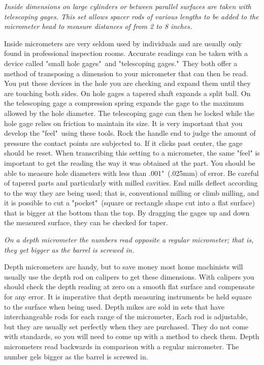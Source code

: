 \bigskip
\textit{Inside dimensions on large cylinders or between parallel surfaces are
taken with telescoping gages. This set allows spacer rods of various lengths to
be added to the micrometer head to measure distances of from 2 to 8 inches.}
\bigskip


Inside micrometers are very seldom used by individuals and are usually only
found in professional inspection rooms. Accurate readings can be taken with a
device called "small hole gages"\ and "telescoping gages."\ They both offer a
method of transposing a dimension to your micrometer that can then be read. You
put these devices in the hole you are checking and expand them until they are
touching both sides. On hole gages a tapered shaft expands a split ball. On the
telescoping gage a compression spring expands the gage to the maximum allowed by
the hole diameter. The telescoping gage can then be locked while the hole gage
relies on friction to maintain its size. It is very important that you develop
the "feel"\ using these tools. Rock the handle end to judge the amount of
pressure the contact points are subjected to. If it clicks past center, the gage
should be reset. When transcribing this setting to a micrometer, the same "feel"
is important to get the reading the way it was obtained at the part. You should
be able to measure hole diameters with less than .001"\ (.025mm) of error. Be
careful of tapered parts and particularly with milled cavities. End mills
deflect according to the way they are being used; that is, conventional milling
or climb milling, and it is possible to cut a "pocket"\ (square or rectangle
shape cut into a flat surface) that is bigger at the bottom than the top. By
dragging the gages up and down the measured surface, they can be checked for
taper.

\bigskip
\textit{On a depth micrometer the numbers read opposite a regular micrometer;
that is, they get bigger as the barrel is screwed in.}
\bigskip


Depth micrometers are handy, but to save money most home machinists will usually
use the depth rod on calipers to get these dimensions. With calipers you should
check the depth reading at zero on a smooth flat surface and compensate for any
error. It is imperative that depth measuring instruments be held square to the
surface when being used. Depth mikes are sold in sets that have interchangeable
rods for each range of the micrometer, Each rod is adjustable, but they are
usually set perfectly when they are purchased. They do not come with standards,
so you will need to come up with a method to check them. Depth micrometers read
backwards in comparison with a regular micrometer. The number gels bigger as the
barrel is screwed in.

